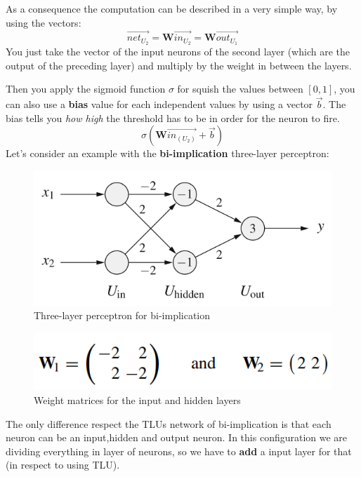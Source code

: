 \documentclass{article}
\begin{document}
As a consequence the computation can be described in a very simple way,
by using the vectors:
$$\vec{net_{U_2}}=\textbf{W}\vec{in_{U_2}}=\textbf{W}\vec{out_{U_1}}$$
You just take the vector of the input neurons of the second layer
(which are the output of the preceding layer) and multiply by the
weight in between the layers.

Then you apply the sigmoid function $\sigma$ for squish the values between $[0,1]$,
you can also use a \textbf{bias} value for each independent values by using a vector $\vec{b}$.
The bias tells you \textit{how high} the threshold has to be in order for the neuron to fire.
$$\sigma\left(\textbf{W}\vec{in_{(U_2)}}+\vec{b}\right)$$
Let's consider an example with the \textbf{bi-implication}
three-layer perceptron:

\begin{figure}[H]
    \centering
    \includegraphics[scale=0.5]{images/three_layer_example.png}
    \caption{Three-layer perceptron for bi-implication}
\end{figure}

\begin{figure}[H]
    \centering
    \includegraphics[scale=0.5]{images/weights_three_layer_example.png}
    \caption{Weight matrices for the input and hidden layers}
\end{figure}

The only difference respect the TLUs network of bi-implication is that
each neuron can be an input,hidden and output neuron. In this configuration
we are dividing everything in layer of neurons, so we have to \textbf{add} a
input layer for that (in respect to using TLU).
\end{document}
